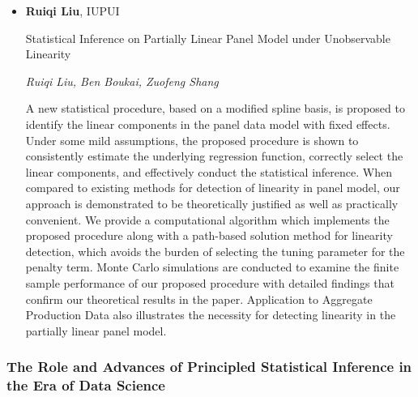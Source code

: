 \begin{itemize}
\item \textbf{Ruiqi Liu}, IUPUI

Statistical Inference on Partially Linear Panel Model under Unobservable Linearity

\emph{\footnotesize Ruiqi Liu, Ben Boukai, Zuofeng Shang}

A new statistical procedure,  based on a modified spline basis, is proposed to identify the linear components in the panel data model with fixed effects. Under some mild assumptions, the proposed procedure is shown to consistently estimate the underlying regression function,  correctly select the linear components, and effectively conduct the statistical inference. When compared to existing methods for detection of  linearity in panel model, our approach is demonstrated to be  theoretically justified as well as practically convenient. We provide a computational algorithm which implements the proposed procedure along with a path-based solution method for linearity detection, which avoids the burden of selecting the tuning parameter for the penalty term. Monte Carlo simulations are conducted to examine the finite sample performance of our proposed procedure with detailed findings that confirm our theoretical results in the paper. Application to  Aggregate Production Data also illustrates the necessity for detecting linearity in the partially linear panel model.

\end{itemize}

\subsubsection*{The Role and Advances of Principled Statistical Inference in the Era of Data Science}

